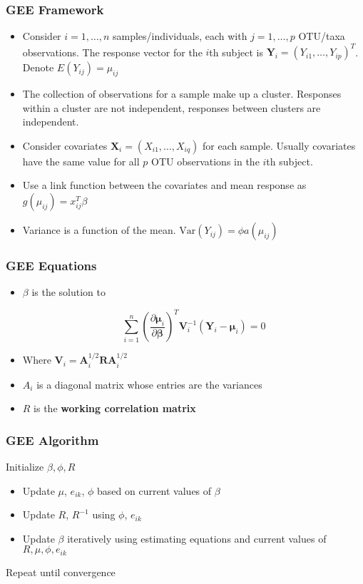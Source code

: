 \documentclass{beamer}
\begin{document}
\begin{frame}
\frametitle{GEE Framework}
\begin{itemize}
  \item Consider $i = 1, \ldots , n$ samples/individuals, each with $j = 1, \ldots , p$ OTU/taxa observations. The response vector for the $i$th subject is $\mathbf{Y}_i = (Y_{i1}, \ldots, Y_{ip})^T$. Denote $E(Y_{ij}) = \mu_{ij}$
  \item The collection of observations for a sample make up a cluster. Responses within a cluster are not independent, responses between clusters are independent.
  \item Consider covariates $\mathbf{X}_i = (X_{i1}, \ldots, X_{iq})$ for each sample. Usually covariates have the same value for all $p$ OTU observations in the $i$th subject.
  \item Use a link function between the covariates and mean response as $g(\mu_{ij}) = x_{ij}^T \beta$
  \item Variance is a function of the mean. $\text{Var}(Y_{ij}) = \phi a(\mu_{ij})$
\end{itemize}
\end{frame}

\begin{frame}
\frametitle{GEE Equations}

\begin{itemize}
  \item $\beta$ is the solution to

  $$\sum_{i=1}^n \left(\frac{\partial  \boldsymbol\mu_i}{\partial \boldsymbol\beta  }\right)^T  \mathbf{V}_i^{-1}(\mathbf{Y}_i - \boldsymbol\mu_i) = 0 $$
  \item Where $\mathbf{V}_i = \mathbf{A}_i^{1/2}\mathbf{R}\mathbf{A}_i^{1/2}$
  \item   $A_i$ is a diagonal matrix whose entries are the variances
  \item $R$ is the \textbf{working correlation matrix}
\end{itemize}
\end{frame}

\begin{frame}
\frametitle{GEE Algorithm}
Initialize $\beta,\phi, R$
\begin{itemize}
  \item Update $\mu$, $e_{ik}$, $\phi$ based on current values of $\beta$
  \item Update $R$, $R^{-1}$ using $\phi$, $e_{ik}$
  \item Update $\beta$ iteratively using estimating equations and current values of $R, \mu, \phi, e_{ik}$
\end{itemize}
Repeat until convergence
\end{frame}
\end{document}
